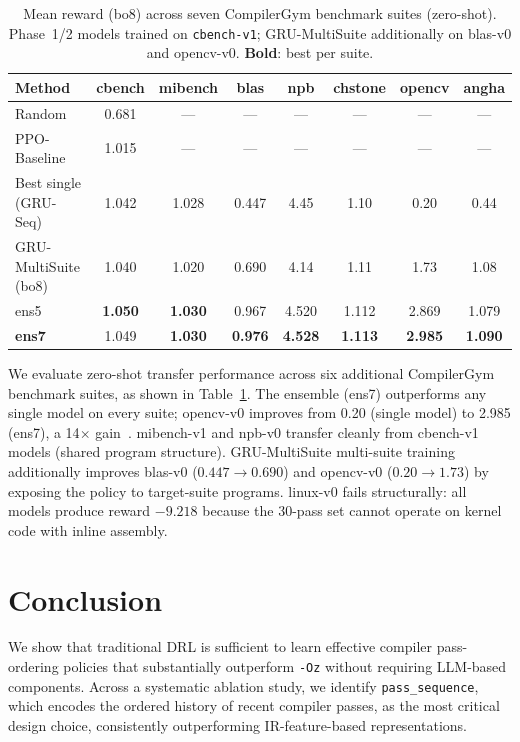 \documentclass{article}
\begin{document}
\begin{table}[h]
  \caption{Mean reward (bo8) across seven CompilerGym benchmark suites (zero-shot).
           Phase~1/2 models trained on \texttt{cbench-v1}; GRU-MultiSuite additionally on
           blas-v0 and opencv-v0.  \textbf{Bold}: best per suite.}
  \label{tab:crosssuite}
  \centering
  \begin{tabular}{lccccccc}
    \toprule
    Method & cbench & mibench & blas & npb & chstone & opencv & angha \\
    \midrule
    Random           & 0.681 & ---   & ---   & ---   & ---   & ---   & ---  \\
    PPO-Baseline           & 1.015 & ---   & ---   & ---   & ---   & ---   & ---  \\
    Best single (GRU-Seq) & 1.042 & 1.028 & 0.447 & 4.45  & 1.10  & 0.20  & 0.44 \\
    GRU-MultiSuite (bo8)        & 1.040 & 1.020 & 0.690 & 4.14  & 1.11  & 1.73  & 1.08 \\
    ens5             & \textbf{1.050} & \textbf{1.030} & 0.967 & 4.520 & 1.112 & 2.869 & 1.079 \\
    \textbf{ens7}    & 1.049 & \textbf{1.030} & \textbf{0.976} & \textbf{4.528} &
      \textbf{1.113} & \textbf{2.985} & \textbf{1.090} \\
    \bottomrule
  \end{tabular}
\end{table}

We evaluate zero-shot transfer performance across six additional CompilerGym benchmark suites, as shown in Table~\ref{tab:crosssuite}.
The ensemble (ens7) outperforms any single model on every suite; opencv-v0
improves from 0.20 (single model) to 2.985 (ens7), a 14$\times$
gain~\cite{lakshminarayanan2017simple}.  mibench-v1 and npb-v0 transfer
cleanly from cbench-v1 models (shared program structure).  GRU-MultiSuite multi-suite
training additionally improves blas-v0 ($0.447\to0.690$) and opencv-v0
($0.20\to1.73$) by exposing the policy to target-suite programs.
linux-v0 fails structurally: all models produce reward $-9.218$ because the
30-pass set cannot operate on kernel code with inline assembly.


\section{Conclusion}

We show that traditional DRL is sufficient to learn effective compiler pass-ordering policies that substantially outperform \texttt{-Oz} without requiring LLM-based components. Across a systematic ablation study, we identify \texttt{pass\_sequence}, which encodes the ordered history of recent compiler passes, as the most critical design choice, consistently outperforming IR-feature-based representations.
\end{document}
